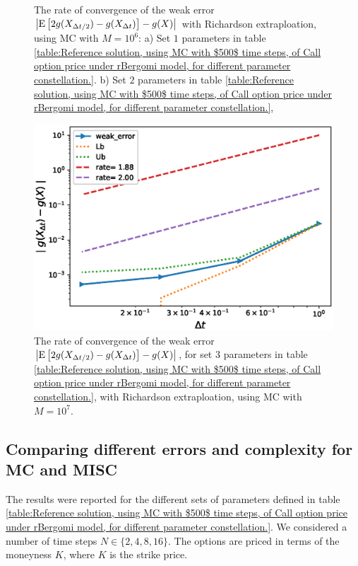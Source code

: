 \begin{figure}[h!]
	\caption{The rate of convergence of the weak error  $\left\lvert\mathrm{E}\left[2 g(X_{\Delta t/2}) -g(X_{\Delta t})\right]-g(X)\right\rvert$   with Richardson extraploation, using MC with $M=10^6$: a) Set $1$ parameters in table \ref{table:Reference solution, using MC with $500$ time steps, of Call option price under rBergomi model, for different parameter constellation.}.  b) Set $2$ parameters in table \ref{table:Reference solution, using MC with $500$ time steps, of Call option price under rBergomi model, for different parameter constellation.}, }
	\label{fig:Weak_rate_H_043_007_with_rich}
\end{figure}


\FloatBarrier

\begin{figure}[!htbp]
	\centering
		\includegraphics[width=0.35\linewidth]{./figures/rBergomi_weak_error_rates/with_richardson/H_002/weak_convergence_order_Bergomi_H_002_K_1_M_1_10_7_richardson_relative}
	\caption{The rate of convergence of the weak error $\left\lvert\mathrm{E}\left[2 g(X_{\Delta t/2}) -g(X_{\Delta t})\right]-g(X)\right\rvert$,  for set $3$ parameters in table \ref{table:Reference solution, using MC with $500$ time steps, of Call option price under rBergomi model, for different parameter constellation.}, with Richardson extraploation, using MC with $M=10^7$. }
	\label{fig:Weak_rate_H_002_with_rich_K1}
\end{figure}
\FloatBarrier




\subsection{Comparing different  errors and complexity for MC and MISC}\label{sec:Comparing different  errors and complexity for MC and MISC}


The results were reported for the different sets of parameters defined in table \ref{table:Reference solution, using MC with $500$ time steps, of Call option price under rBergomi model, for different parameter constellation.}. We considered   a number of time steps $N \in \{2,4,8,16\}$.  The options are priced in terms of the moneyness $K$, where $K$ is the strike price.   

